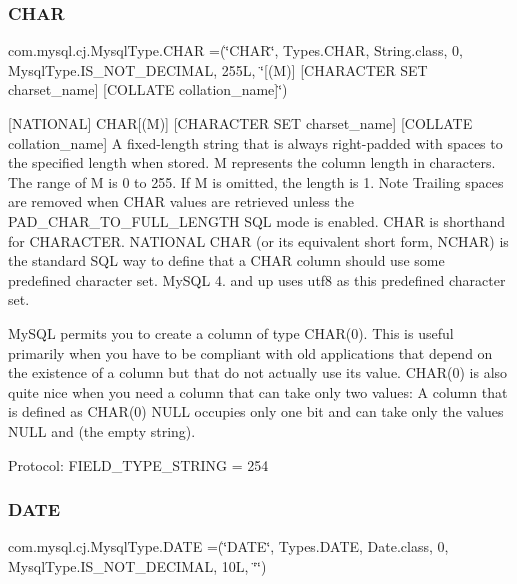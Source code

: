 \subsubsection{\texorpdfstring{C\+H\+AR}{CHAR}}
{\footnotesize\ttfamily com.\+mysql.\+cj.\+Mysql\+Type.\+C\+H\+AR =(\char`\"{}C\+H\+AR\char`\"{}, Types.\+C\+H\+AR, String.\+class, 0, Mysql\+Type.\+I\+S\+\_\+\+N\+O\+T\+\_\+\+D\+E\+C\+I\+M\+AL, 255\+L, \char`\"{}\mbox{[}(\+M)\mbox{]} \mbox{[}\+C\+H\+A\+R\+A\+C\+T\+E\+R S\+E\+T charset\+\_\+name\mbox{]} \mbox{[}\+C\+O\+L\+L\+A\+T\+E collation\+\_\+name\mbox{]}\char`\"{})}

\mbox{[}N\+A\+T\+I\+O\+N\+AL\mbox{]} C\+H\+AR\mbox{[}(M)\mbox{]} \mbox{[}C\+H\+A\+R\+A\+C\+T\+ER S\+ET charset\+\_\+name\mbox{]} \mbox{[}C\+O\+L\+L\+A\+TE collation\+\_\+name\mbox{]} A fixed-\/length string that is always right-\/padded with spaces to the specified length when stored. M represents the column length in characters. The range of M is 0 to 255. If M is omitted, the length is 1. Note Trailing spaces are removed when C\+H\+AR values are retrieved unless the P\+A\+D\+\_\+\+C\+H\+A\+R\+\_\+\+T\+O\+\_\+\+F\+U\+L\+L\+\_\+\+L\+E\+N\+G\+TH S\+QL mode is enabled. C\+H\+AR is shorthand for C\+H\+A\+R\+A\+C\+T\+ER. N\+A\+T\+I\+O\+N\+AL C\+H\+AR (or its equivalent short form, N\+C\+H\+AR) is the standard S\+QL way to define that a C\+H\+AR column should use some predefined character set. My\+S\+QL 4. and up uses utf8 as this predefined character set.

My\+S\+QL permits you to create a column of type C\+H\+A\+R(0). This is useful primarily when you have to be compliant with old applications that depend on the existence of a column but that do not actually use its value. C\+H\+A\+R(0) is also quite nice when you need a column that can take only two values\+: A column that is defined as C\+H\+A\+R(0) N\+U\+LL occupies only one bit and can take only the values N\+U\+LL and \textquotesingle{}\textquotesingle{} (the empty string).

Protocol\+: F\+I\+E\+L\+D\+\_\+\+T\+Y\+P\+E\+\_\+\+S\+T\+R\+I\+NG = 254 \mbox{\label{enumcom_1_1mysql_1_1cj_1_1_mysql_type_a27b01e95b5b669490e934d7484aa67eb}} 
\subsubsection{\texorpdfstring{D\+A\+TE}{DATE}}
{\footnotesize\ttfamily com.\+mysql.\+cj.\+Mysql\+Type.\+D\+A\+TE =(\char`\"{}D\+A\+TE\char`\"{}, Types.\+D\+A\+TE, Date.\+class, 0, Mysql\+Type.\+I\+S\+\_\+\+N\+O\+T\+\_\+\+D\+E\+C\+I\+M\+AL, 10\+L, \char`\"{}\char`\"{})}

